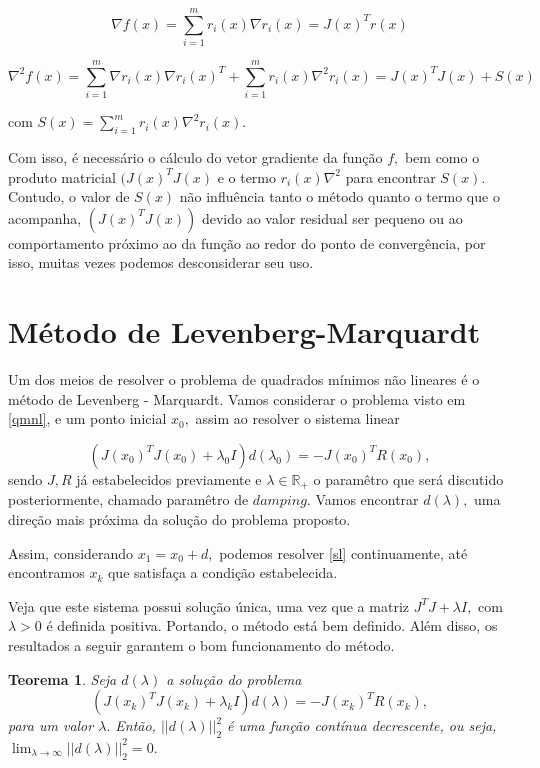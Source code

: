\documentclass[12pt,a4paper]{article}
\newtheorem{teo}{Teorema}[section]
\begin{document}
	\[\nabla f(x) = \sum_{i=1}^{m} r_i(x)\nabla r_i(x) = J(x)^{T}r(x)\]
	
	\[\nabla^{2} f(x) = \sum_{i=1}^{m} \nabla r_i(x)\nabla r_i(x)^{T}
	+ \sum_{i=1}^{m} r_i(x) \nabla^{2}r_i(x) = J(x)^{T}J(x) + S(x)\]
	
	com $S(x) = \sum_{i=1}^{m} r_i(x)\nabla^{2}r_i(x).$
	
	Com isso, é necessário o cálculo do vetor gradiente da função $f,$ bem como o produto matricial $(J(x)^{T}J(x)$ e o termo $r_i(x)\nabla^{2}$ para encontrar $S(x).$ Contudo, o valor de $S(x)$ não influência tanto o método quanto o termo que o acompanha, $(J(x)^{T}J(x))$ devido ao valor residual ser pequeno ou ao comportamento próximo ao da função ao redor do ponto de convergência, por isso, muitas vezes podemos desconsiderar seu uso.
	
	\section{Método de Levenberg-Marquardt}\label{lm}
	
	Um dos meios de resolver o problema de quadrados mínimos não lineares é o método de Levenberg - Marquardt. Vamos considerar o problema visto em \ref{qmnl}, e um ponto inicial $x_0,$ assim ao resolver o sistema linear
	 
	\begin{equation*} 
	(J(x_0)^{T}J(x_0) + \lambda_0 I ) d(\lambda_0) = - J(x_0)^T R(x_0),
	\end{equation*}
	sendo $J, R$ já estabelecidos previamente e $\lambda \in \mathbb{R}_+$ o paramêtro que será discutido posteriormente, chamado paramêtro de $damping.$ Vamos encontrar $d(\lambda),$ uma direção mais próxima da solução do problema proposto.
	
	Assim, considerando $x_1 = x_0 + d,$ podemos resolver \ref{sl} continuamente, até encontramos $x_k$ que satisfaça a condição estabelecida.
	
	Veja que este sistema possui solução única, uma vez que a matriz $J^{T}J + \lambda I,$ com $\lambda > 0$ é definida positiva. Portando, o método está bem definido. Além disso, os resultados a seguir garantem o bom funcionamento do método.
	
	\begin{teo}
		Seja $d(\lambda)$ a solução do problema 
		\begin{equation} \label{sl}
		(J(x_k)^{T}J(x_k) + \lambda_k I ) d(\lambda) = - J(x_k)^T R(x_k),
		\end{equation}
		para um valor $\lambda.$ Então, $||d(\lambda)||_2^2$ é uma função contínua decrescente, ou seja, $\lim_{\lambda\rightarrow \infty}{||d(\lambda)||_2^2} = 0.$
	\end{teo}
	
\end{document}
